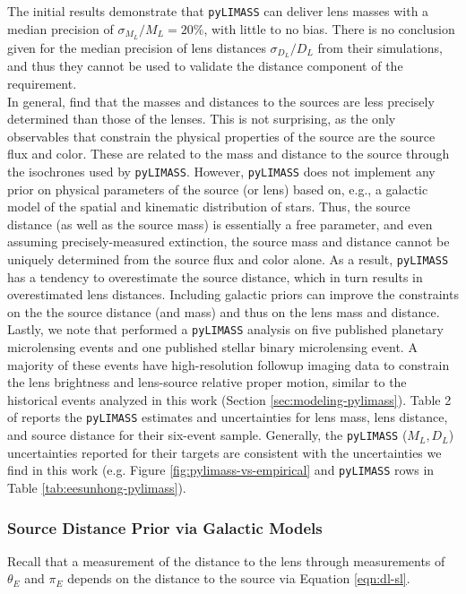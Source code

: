 \documentclass[twocolumn]{aastex631}
\begin{document}
\indent The initial \cite{bachelet:2024a} results demonstrate that \texttt{pyLIMASS} can deliver lens masses with a median precision of $\sigma_{M_L}/{M_L} = 20\%$, with little to no bias. There is no conclusion given for the median precision of lens distances $\sigma_{D_L}/{D_L}$ from their simulations, and thus they cannot be used to validate the distance component of the requirement. \\
\indent  In general, \cite{bachelet:2024a} find that the masses and distances to the sources are less precisely determined than those of the lenses. This is not surprising, as the only observables that constrain the physical properties of the source are the source flux and color. These are related to the mass and distance to the source through the isochrones used by \texttt{pyLIMASS}. However, \texttt{pyLIMASS} does not implement any prior on physical parameters of the source (or lens) based on, e.g., a galactic model of the spatial and kinematic distribution of stars. Thus, the source distance (as well as the source mass) is essentially a free parameter, and even assuming precisely-measured extinction, the source mass and distance cannot be uniquely determined from the source flux and color alone. As a result, \texttt{pyLIMASS} has a tendency to overestimate the source distance, which in turn results in overestimated lens distances. Including galactic priors can improve the constraints on the the source distance (and mass) and thus on the lens mass and distance. \\
\indent Lastly, we note that \cite{bachelet:2024a} performed a \texttt{pyLIMASS} analysis on five published planetary microlensing events and one published stellar binary microlensing event. A majority of these events have high-resolution followup imaging data to constrain the lens brightness and lens-source relative proper motion, similar to the historical events analyzed in this work (Section \ref{sec:modeling-pylimass}). Table 2 of \cite{bachelet:2024a} reports the \texttt{pyLIMASS} estimates and uncertainties for lens mass, lens distance, and source distance for their six-event sample. Generally, the \texttt{pyLIMASS} ($M_L, D_L$) uncertainties reported for their targets are consistent with the uncertainties we find in this work (e.g. Figure \ref{fig:pylimass-vs-empirical} and \texttt{pyLIMASS} rows in Table \ref{tab:eesunhong-pylimass}).

\subsubsection{Source Distance Prior via Galactic Models}\label{subsec:galactic_models}
Recall that a measurement of the distance to the lens through measurements of $\theta_E$ and $\pi_E$ depends on the distance to the source via Equation \ref{eqn:dl-sl}. 
\end{document}
